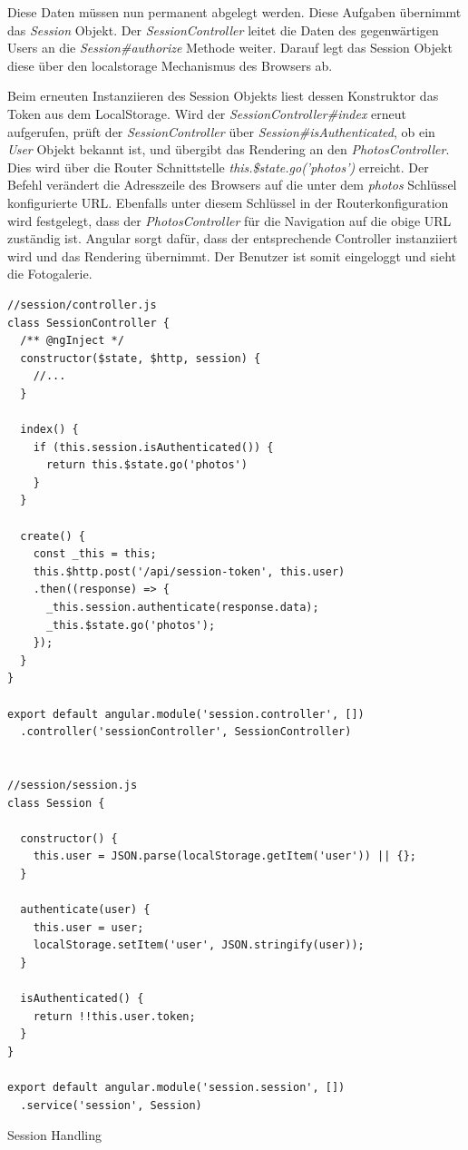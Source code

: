 Diese Daten müssen nun permanent abgelegt werden. Diese Aufgaben übernimmt das \emph{Session} Objekt. Der \emph{SessionController} leitet die Daten des gegenwärtigen Users an die \emph{Session\#authorize} Methode weiter. Darauf legt das Session Objekt diese über den \gls{localstorage} Mechanismus des Browsers ab.

Beim erneuten Instanziieren des Session Objekts liest dessen Konstruktor das Token aus dem LocalStorage. Wird der \emph{SessionController\#index} erneut aufgerufen, prüft der \emph{SessionController} über \emph{Session\#isAuthenticated}, ob ein \emph{User} Objekt bekannt ist, und übergibt das Rendering an den \emph{PhotosController}. Dies wird über die Router Schnittstelle \emph{this.\$state.go('photos')} erreicht. Der Befehl verändert die Adresszeile des Browsers auf die unter dem  \emph{photos} Schlüssel konfigurierte URL. Ebenfalls unter diesem Schlüssel in der Routerkonfiguration
wird festgelegt, dass der \emph{PhotosController} für die Navigation auf die obige URL zuständig ist. Angular sorgt dafür, dass der entsprechende Controller instanziiert wird und das Rendering übernimmt. Der Benutzer ist somit eingeloggt und sieht die Fotogalerie.

\begin{listing}[H]
\begin{verbatim}
//session/controller.js
class SessionController {
  /** @ngInject */
  constructor($state, $http, session) {
    //...
  }

  index() {
    if (this.session.isAuthenticated()) {
      return this.$state.go('photos')
    }
  }

  create() {
    const _this = this;
    this.$http.post('/api/session-token', this.user)
    .then((response) => {
      _this.session.authenticate(response.data);
      _this.$state.go('photos');
    });
  }
}

export default angular.module('session.controller', [])
  .controller('sessionController', SessionController)


//session/session.js
class Session {

  constructor() {
    this.user = JSON.parse(localStorage.getItem('user')) || {};
  }

  authenticate(user) {
    this.user = user;
    localStorage.setItem('user', JSON.stringify(user));
  }

  isAuthenticated() {
    return !!this.user.token;
  }
}

export default angular.module('session.session', [])
  .service('session', Session)

\end{verbatim}
\caption{Session Handling}
\label{lst:session_handling}
\end{listing}

